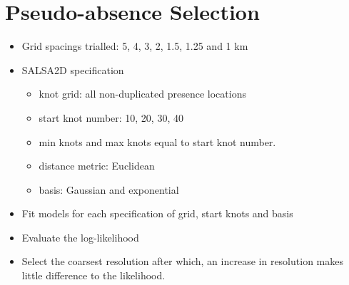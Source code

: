\vspace{2cm}



\section{Pseudo-absence Selection}

\begin{itemize}
    \item Grid spacings trialled: 5, 4, 3, 2, 1.5, 1.25 and 1 km
    \item SALSA2D specification
    \begin{itemize}
        \item knot grid: all non-duplicated presence locations
        \item start knot number: 10, 20, 30, 40
        \item min knots and max knots equal to start knot number. 
        \item distance metric: Euclidean
        \item basis: Gaussian and exponential
    \end{itemize}
    \item Fit models for each specification of grid, start knots and basis
    \item Evaluate the log-likelihood
    \item Select the coarsest resolution after which, an increase in resolution makes little difference to the likelihood. 
\end{itemize}

